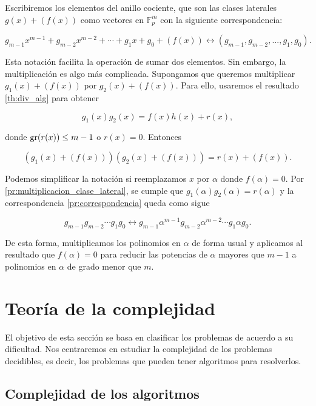 Escribiremos los elementos del anillo cociente, que son las clases laterales $g(x) + (f(x))$ como vectores en $\mathbb{F}_p^m$ con la siguiente correspondencia:

\begin{equation}
    \label{pr:correspondencia}
    g_{m-1} x^{m-1} + g_{m-2} x^{m-2} + \cdots + g_{1} x + g_0 + (f(x)) \leftrightarrow (g_{m-1}, g_{m-2}, ..., g_1, g_0).
\end{equation}

Esta notación facilita la operación de sumar dos elementos. Sin embargo, la multiplicación es algo más complicada. Supongamos que queremos multiplicar $g_1(x) + (f(x))$ por $g_2(x) + (f(x))$. Para ello, usaremos el resultado \ref{th:div_alg} para obtener

\begin{equation}
    \label{pr:multiplicacion_clase_lateral}
    g_1(x) g_2(x) = f(x) h(x) + r(x),
\end{equation}

donde $\operatorname{gr}(r(x)) \leq m - 1$ o $r(x) = 0$. Entonces 

$$(g_1(x) + (f(x))) (g_2(x) + (f(x))) = r(x) + (f(x)).$$

Podemos simplificar la notación si reemplazamos $x$ por $\alpha$ donde $f(\alpha) = 0$. Por \eqref{pr:multiplicacion_clase_lateral}, se cumple que $g_1(\alpha) g_2(\alpha) = r(\alpha)$ y la correspondencia \eqref{pr:correspondencia} queda como sigue

$$g_{m-1} g_{m-2} \cdots g_1 g_0 \leftrightarrow  g_{m-1} \alpha^{m-1} g_{m-2} \alpha^{m-2}\cdots g_1 \alpha g_0.$$

De esta forma, multiplicamos los polinomios en $\alpha$ de forma usual y aplicamos al resultado que $f(\alpha) = 0$ para reducir las potencias de $\alpha$ mayores que $m-1$ a polinomios en $\alpha$ de grado menor que $m$.


\section{Teoría de la complejidad}

El objetivo de esta sección se basa en clasificar los problemas de acuerdo a su dificultad. Nos centraremos en estudiar la complejidad de los problemas decidibles, es decir, los problemas que pueden tener algoritmos para resolverlos.

\subsection{Complejidad de los algoritmos}

